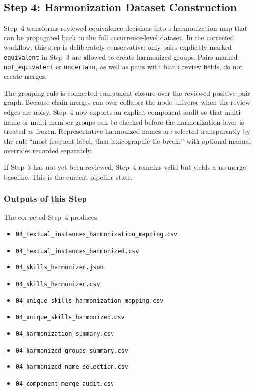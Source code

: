 \subsection{Step 4: Harmonization Dataset Construction}
\label{sec:step4_harmonization_dataset}

Step~4 transforms reviewed equivalence decisions into a harmonization map that can be propagated back to the full occurrence-level dataset. In the corrected workflow, this step is deliberately conservative: only pairs explicitly marked \texttt{equivalent} in Step~3 are allowed to create harmonized groups. Pairs marked \texttt{not\_equivalent} or \texttt{uncertain}, as well as pairs with blank review fields, do not create merges.

The grouping rule is connected-component closure over the reviewed positive-pair graph. Because chain merges can over-collapse the node universe when the review edges are noisy, Step~4 now exports an explicit component audit so that multi-name or multi-member groups can be checked before the harmonization layer is treated as frozen. Representative harmonized names are selected transparently by the rule ``most frequent label, then lexicographic tie-break,'' with optional manual overrides recorded separately.

If Step~3 has not yet been reviewed, Step~4 remains valid but yields a no-merge baseline. This is the current pipeline state.

\subsubsection{Outputs of this Step}
\label{sec:step4_outputs}

The corrected Step~4 produces:
\begin{itemize}
    \item \texttt{04\_textual\_instances\_harmonization\_mapping.csv}
    \item \texttt{04\_textual\_instances\_harmonized.csv}
    \item \texttt{04\_skills\_harmonized.json}
    \item \texttt{04\_skills\_harmonized.csv}
    \item \texttt{04\_unique\_skills\_harmonization\_mapping.csv}
    \item \texttt{04\_unique\_skills\_harmonized.csv}
    \item \texttt{04\_harmonization\_summary.csv}
    \item \texttt{04\_harmonized\_groups\_summary.csv}
    \item \texttt{04\_harmonized\_name\_selection.csv}
    \item \texttt{04\_component\_merge\_audit.csv}
\end{itemize}

